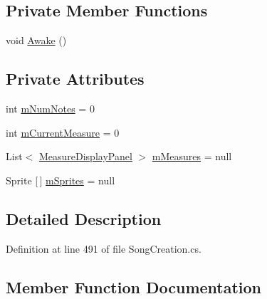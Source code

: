 \subsection*{Private Member Functions}
\begin{DoxyCompactItemize}
\item 
void \hyperlink{class_song_creation_1_1_note_display_container_a42c39fa44ccac736377809dbec6642db}{Awake} ()
\end{DoxyCompactItemize}
\subsection*{Private Attributes}
\begin{DoxyCompactItemize}
\item 
int \hyperlink{class_song_creation_1_1_note_display_container_a5ce614dc2b8f3d41f885639a92c97b1b}{m\+Num\+Notes} = 0
\item 
int \hyperlink{class_song_creation_1_1_note_display_container_ad63614e1c51c2db44cfc0fc21704c4ff}{m\+Current\+Measure} = 0
\item 
List$<$ \hyperlink{class_song_creation_1_1_measure_display_panel}{Measure\+Display\+Panel} $>$ \hyperlink{class_song_creation_1_1_note_display_container_a19c1c32db579c642fbc1b5bce0c80e7a}{m\+Measures} = null
\item 
Sprite \mbox{[}$\,$\mbox{]} \hyperlink{class_song_creation_1_1_note_display_container_ab8dbbd27a233f83f0402608e15699ecf}{m\+Sprites} = null
\end{DoxyCompactItemize}


\subsection{Detailed Description}


Definition at line 491 of file Song\+Creation.\+cs.



\subsection{Member Function Documentation}
\mbox{\label{class_song_creation_1_1_note_display_container_aa8b087f8e218c3e08df5d5a85c952b2d}} 
